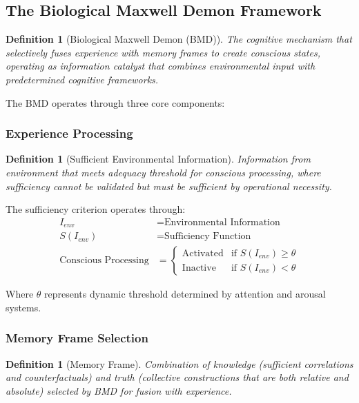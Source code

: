 \documentclass[12pt,a4paper]{article}
\newtheorem{definition}[theorem]{Definition}
\begin{document}
\subsection{The Biological Maxwell Demon Framework}

\begin{definition}[Biological Maxwell Demon (BMD)]
The cognitive mechanism that selectively fuses experience with memory frames to create conscious states, operating as information catalyst that combines environmental input with predetermined cognitive frameworks.
\end{definition}

The BMD operates through three core components:

\subsubsection{Experience Processing}
\begin{definition}[Sufficient Environmental Information]
Information from environment that meets adequacy threshold for conscious processing, where sufficiency cannot be validated but must be sufficient by operational necessity.
\end{definition}

The sufficiency criterion operates through:
\begin{align}
I_{env} &= \text{Environmental Information} \\
S(I_{env}) &= \text{Sufficiency Function} \\
\text{Conscious Processing} &= \begin{cases}
\text{Activated} & \text{if } S(I_{env}) \geq \theta \\
\text{Inactive} & \text{if } S(I_{env}) < \theta
\end{cases}
\end{align}

Where $\theta$ represents dynamic threshold determined by attention and arousal systems.

\subsubsection{Memory Frame Selection}
\begin{definition}[Memory Frame]
Combination of knowledge (sufficient correlations and counterfactuals) and truth (collective constructions that are both relative and absolute) selected by BMD for fusion with experience.
\end{definition}
\end{document}

